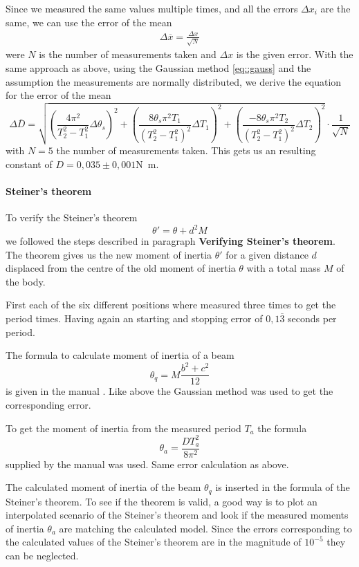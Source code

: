 Since we measured the same values multiple times, and all the errors $\Delta x_i$ are the same, we can use the error of the mean
\begin{align}
\Delta \overline{x} = \frac{\Delta x}{\sqrt{N}}
\label{eq::stdmean}
\end{align}
were $N$ is the number of measurements taken and $\Delta x$ is the given error.
With the same approach as above, using the Gaussian method \ref{eq::gauss} and the assumption the measurements are normally distributed, we derive the equation for the error of the mean
\[
\Delta\overline{D} = \sqrt{\left(\frac{4\pi^2}{T_2^2 - T_1^2 }\Delta\theta_s \right)^2 + \left(\frac{8\theta_s \pi^2T_1}{(T_2^2 - T_1^2)^2 }\Delta T_1 \right)^2 +  \left(\frac{-8\theta_s\pi^2T_2}{(T_2^2 - T_1^2)^2 }\Delta T_2 \right)^2} \cdot \frac{1}{\sqrt{N}}
\]
with $N=5$ the number of measurements taken.
This gets us an resulting constant of $D = 0,035 \pm 0,001$\si{\N\m}.

\paragraph{Steiner's theorem}
To verify the Steiner's theorem
\[
\theta' = \theta + d^2M
\] 
we followed the steps described in paragraph \textbf{Verifying Steiner's theorem}.
The theorem gives us the new moment of inertia $\theta'$ for a given distance $d$ displaced from the centre of the old moment of inertia $\theta$ with a total mass $M$ of the body.


First each of the six different positions where measured three times to get the period times.
Having again an starting and stopping error of $0,1\overline{3}$ seconds per period.



The formula to calculate moment of inertia of a beam 
\[
\theta_q = M\frac{b^2 +c^2}{12}
\]
is given in the manual \cite{manual}.
Like above the Gaussian method was used to get the corresponding error.

To get the moment of inertia from the measured period $T_a$ the formula
\[
\theta_a = \frac{DT_a^2}{8\pi^2}
\] 
supplied by the manual \cite{manual} was used. 
Same error calculation as above.

The calculated moment of inertia of the beam $\theta_q$ is inserted in the formula of the Steiner's theorem. 
To see if the theorem is valid, a good way is to plot an interpolated scenario of the Steiner's theorem and look if the measured moments of inertia $\theta_a$ are matching the calculated model.
Since the errors corresponding to the calculated values of the Steiner's theorem are in the magnitude of $10^{-5}$ they can be neglected. 

